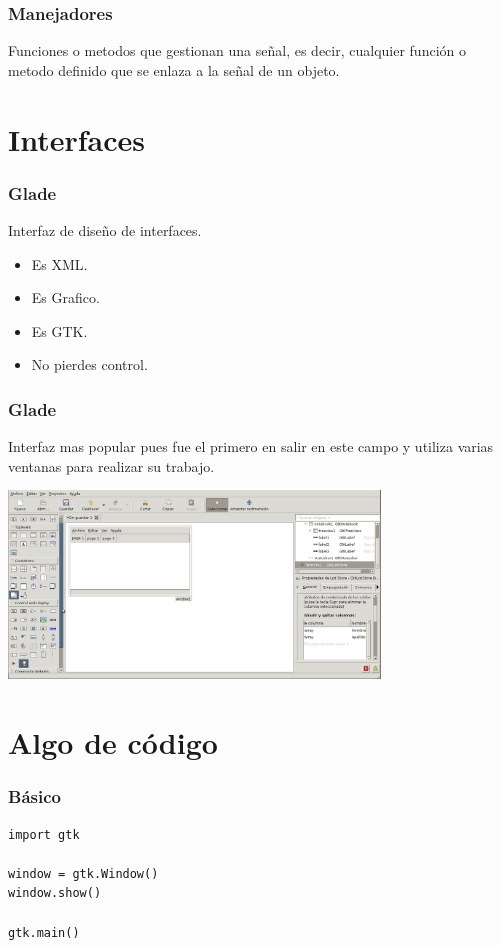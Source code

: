 \documentclass[10pt]{beamer}
\begin{document}
  \begin{frame}[containsverbatim]
    \frametitle{Manejadores}
  
    Funciones o metodos que gestionan una señal, es decir, cualquier función o
    metodo definido que se enlaza a la señal de un objeto.
  \end{frame}

  \section{Interfaces}
  
  \begin{frame}[containsverbatim]
    \frametitle{Glade}

    Interfaz de diseño de interfaces.
    \begin{itemize}
      \item Es XML.
      \item Es Grafico.
      \item Es GTK.
      \item No pierdes control.
    \end{itemize}

  \end{frame}
  
  \begin{frame}[containsverbatim]
    \frametitle{Glade}
    Interfaz mas popular pues fue el primero en salir en este campo y utiliza
    varias ventanas para realizar su trabajo.
    \begin{center}
      \includegraphics[height=5cm]{glade_shot.png}
    \end{center}
  \end{frame}
  
  \section{Algo de código}
  
  \begin{frame}[containsverbatim]
    \frametitle{Básico}
    \begin{verbatim}
import gtk

window = gtk.Window()
window.show()

gtk.main()
    \end{verbatim}
  \end{frame}
  
\end{document}
